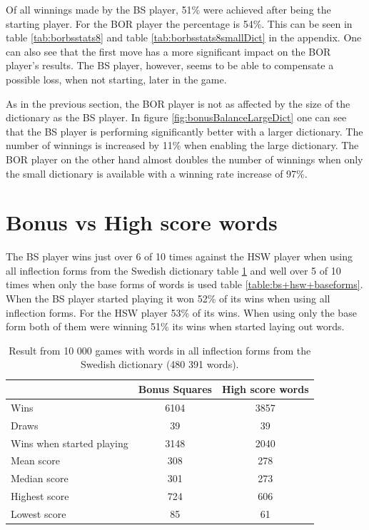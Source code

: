 \documentclass[a4paper, 12pt]{report}
\begin{document}
Of all winnings made by the BS player, 51\% were achieved after being the starting player. For the BOR player the percentage is 54\%. This can be seen in table \ref{tab:borbsstats8} and table \ref{tab:borbsstats8smallDict} in the appendix. One can also see that the first move has a more significant impact on the BOR player's results. The BS player, however, seems to be able to compensate a possible loss, when not starting, later in the game.

As in the previous section, the BOR player is not as affected by the size of the dictionary as the BS player. In figure \ref{fig:bonusBalanceLargeDict} one can see that the BS player is performing significantly better with a larger dictionary. The number of winnings is increased by 11\% when enabling the large dictionary. The BOR player on the other hand almost doubles the number of winnings when only the small dictionary is available with a winning rate increase of 97\%. 







\section{Bonus vs High score words}
\label{sec:bonusHigh}
The BS player wins just over 6 of 10 times against the HSW player when using all inflection forms from the Swedish dictionary table \ref{table:bs+hsw+allwords} and well over 5 of 10 times when only the base forms of words is used table \ref{table:bs+hsw+baseforms}. When the BS player started playing it won 52\% of its wins when using all inflection forms. For the HSW player 53\% of its wins. When using only the base form both of them were winning 51\% its wins when started laying out words.

\begin{table}[h]
\centering
    \begin{tabular}{ l | c | c }
   	& Bonus Squares & High score words \\
   	\hline
   	Wins & 6104 & 3857 \\
   	Draws & 39 & 39 \\   	
	Wins when started playing & 3148 & 2040 \\   	
	Mean score & 308 & 278 \\
	Median score & 301 & 273 \\	 	 
	Highest score & 724 & 606 \\
	Lowest score & 85 & 61 \\		
    \end{tabular}
\caption{Result from 10 000 games with words in all inflection forms from the Swedish dictionary (480 391 words).}
\label{table:bs+hsw+allwords}
\end{table}
\end{document}
